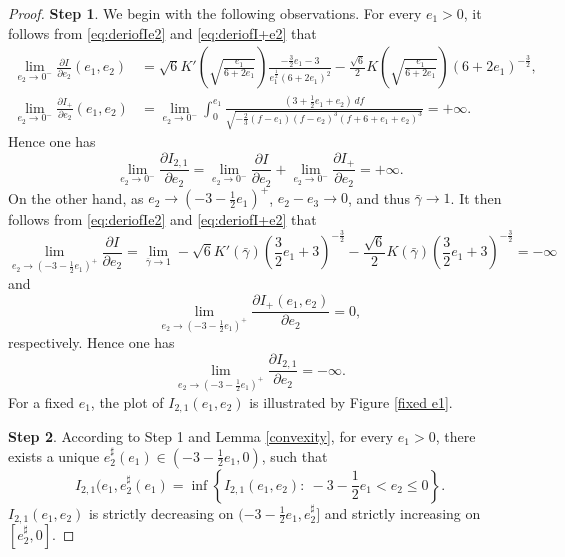 \documentclass[reqno,12pt]{amsart}
\begin{document}
{ 
 \begin{proof}
 \textbf{Step 1}.
 We begin with the following observations.
 For every $e_1>0$, it follows from \eqref{eq:deriofIe2} and \eqref{eq:deriofI+e2} that 
 \begin{equation*}
 \begin{aligned}
     \lim_{e_2\to 0^-} \frac{\partial I}{\partial e_2}(e_1,e_2)  &= \sqrt{6}K' \left(\sqrt{\frac{e_1}{6+2e_1}}\right) \frac{-\frac{3}{2}e_1-3}{e_1^{\frac{1}{2}}(6+2e_1)^2} -\frac{\sqrt{6}}{2}K \left(\sqrt{\frac{e_1}{6+2e_1}}\right)(6+2e_1)^{-\frac{3}{2}},\\
      \lim_{e_2\to 0^-}\frac{\partial I_+}{\partial e_2}(e_1,e_2) & = 
      \lim_{e_2 \to 0^-} \int_0^{e_1} \frac{(3+\frac12 e_1 +e_2) \, df}{\sqrt{-\frac23 (f-e_1) (f-e_2)^3 (f+6+e_1+e_2)^3}} =+\infty.
 \end{aligned}     
 \end{equation*}
Hence one has
$$
    \lim_{e_2\to 0^-}\frac{\partial I_{2,1}}{\partial e_2} =\lim_{e_2\to 0^-}\frac{\partial I}{\partial e_2}+\lim_{e_2\to 0^-}\frac{\partial I_+}{\partial e_2}=+\infty.$$
On the other hand,  as $e_2 \to (-3 - \frac12 e_1)^+$, $e_2 - e_3 \to 0$, and thus $\bar{\gamma} \to 1$. It then follows from \eqref{eq:deriofIe2} and \eqref{eq:deriofI+e2} that
\begin{equation*}
    \lim_{e_2\to (-3 -\frac{1}{2}e_1)^+} \frac{\partial I }{\partial e_2}
    = \lim_{\bar{\gamma}\to1}-\sqrt{6}K'(\bar{\gamma})\left(\frac{3}{2}e_1+3\right)^{-\frac32} - \frac{\sqrt{6}}{2}  K(\bar{\gamma})\left(\frac{3}{2}e_1+3\right)^{-\frac{3}{2}}=-\infty
    \end{equation*}
    and
    \begin{equation*}
 \lim_{e_2\to (-3 -\frac{1}{2}e_1)^+} \frac{\partial I_+(e_1,e_2)}{\partial e_2} =0,
      \end{equation*}
      respectively.
Hence one has
$$\lim_{e_2\to (-3 -\frac{1}{2}e_1)^+} \frac{\partial I_{2, 1 } }{\partial e_2}
    =-\infty.$$
For a fixed $e_1$, the plot of $I_{2,1}(e_1,e_2)$ is illustrated by Figure \ref{fixed e1}.



    \textbf{Step 2}. According to Step 1 and Lemma \ref{convexity}, for every $e_1>0$, there exists a unique ${e}^\sharp_2 (e_1) \in (-3 -\frac12 e_1, 0)$, such that 
    \begin{equation*}
     I_{2, 1}(e_1, {e}^\sharp_2(e_1) = \inf \left\{ I_{2, 1}(e_1, e_2): \ -3-\frac12 e_1 <e_2 \leq 0 \right\}.   
    \end{equation*}
   $I_{2, 1}(e_1, e_2)$ is strictly decreasing on $(-3 -\frac12 e_1, {e}^\sharp_2]$ and strictly increasing on $[{e}^\sharp_2, 0]$.  


\end{proof}}
\end{document}
